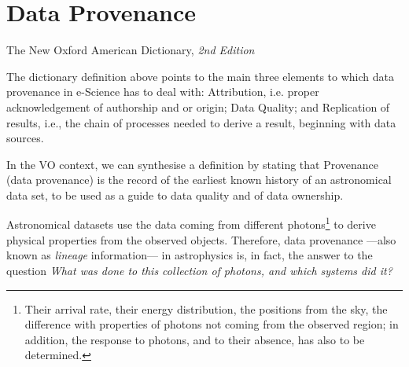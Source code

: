 \chapter{Data Provenance} %
\label{cha:data_provenance_in_the_vo}


	{The New  Oxford American Dictionary, \emph{2nd Edition}}
	
	\noindent
	The dictionary definition above points to the main three
	elements to which data provenance in e-Science has to deal
	with: Attribution, i.e. proper acknowledgement of authorship
	and or origin; Data Quality; and Replication of results, i.e.,
	the chain of processes needed to derive a result, beginning
	with data sources.
	
	 In the VO context, we can synthesise a definition by stating
	that Provenance (data provenance) is the record of the earliest
	known history of an astronomical data set, to be used as a
	guide to data quality and of data ownership.
	
	 Astronomical datasets use the data coming from different
	photons\footnote{Their arrival rate, their energy distribution,
	the positions from the sky, the difference with properties of
	photons not coming from the observed region; in addition, the
	response to photons, and to their absence, has also to be
	determined.} to derive physical properties from the observed
	objects. Therefore, data provenance ---also known as
	\emph{lineage} information--- in astrophysics is, in fact, the
	answer to the question \emph{What was done to this collection
	of photons, and which systems did it?}
	
